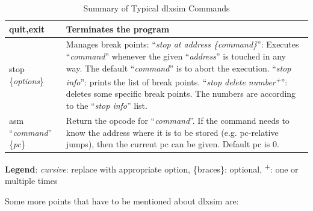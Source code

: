\begin{table}[!htb]
\begin{tabular}{|p{3cm}|p{13cm}|}
		quit,exit & Terminates the program\\\hline
		stop \{\emph{options}\} & Manages break points:
		``\emph{stop at address \{command\}}'': Executes ``\emph{command}''
		whenever the given ``\emph{address}'' is touched in any way. The default
		``\emph{command}'' is to abort the execution.
		``\emph{stop info}'': prints the list of break points.
		``\emph{stop delete number\textsuperscript{+}}'': deletes some specific
		break points. The numbers are according to the ``\emph{stop info}''
		list.\\\hline
		asm ``\emph{command}'' \{\emph{pc}\} & Return the opcode for
		``\emph{command}''. If the command needs to know the address where it is
		to be stored (e.g. pc-relative jumps), then the current pc can be given.
		Default pc is 0.\\\hline
	\end{tabular}
	\caption{Summary of Typical dlxsim Commands}
	\label{fig:fig37}
\end{table}
\textbf{Legend}: \emph{cursive}: replace with appropriate option,
\{braces\}: optional, \textsuperscript{+}: one or multiple times

Some more points that have to be mentioned about dlxsim are:

